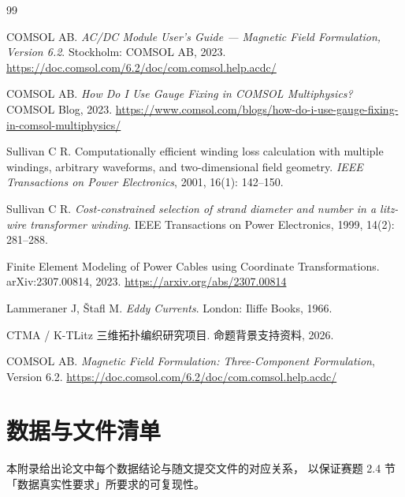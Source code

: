 \documentclass[12pt, a4paper]{ctexart}
\begin{document}
\newpage
\begin{thebibliography}{99}

COMSOL AB. \textit{AC/DC Module User's Guide — Magnetic Field Formulation,
Version 6.2}. Stockholm: COMSOL AB, 2023.
\url{https://doc.comsol.com/6.2/doc/com.comsol.help.acdc/}

COMSOL AB. \textit{How Do I Use Gauge Fixing in COMSOL Multiphysics?}
COMSOL Blog, 2023.
\url{https://www.comsol.com/blogs/how-do-i-use-gauge-fixing-in-comsol-multiphysics/}

Sullivan C R. Computationally efficient winding loss calculation with
multiple windings, arbitrary waveforms, and two-dimensional field geometry.
\textit{IEEE Transactions on Power Electronics}, 2001, 16(1): 142--150.

Sullivan C R. \textit{Cost-constrained selection of strand diameter and number
in a litz-wire transformer winding}. IEEE Transactions on Power Electronics,
1999, 14(2): 281--288.

Finite Element Modeling of Power Cables using Coordinate Transformations.
arXiv:2307.00814, 2023.
\url{https://arxiv.org/abs/2307.00814}

Lammeraner J, \v{S}tafl M. \textit{Eddy Currents}. London: Iliffe Books, 1966.

CTMA / K-TLitz 三维拓扑编织研究项目. 命题背景支持资料, 2026.

COMSOL AB. \textit{Magnetic Field Formulation: Three-Component Formulation},
Version 6.2. \url{https://doc.comsol.com/6.2/doc/com.comsol.help.acdc/}

\end{thebibliography}

\newpage
\appendix
\section{数据与文件清单}

本附录给出论文中每个数据结论与随文提交文件的对应关系，
以保证赛题 2.4 节「数据真实性要求」所要求的可复现性。
\end{document}
